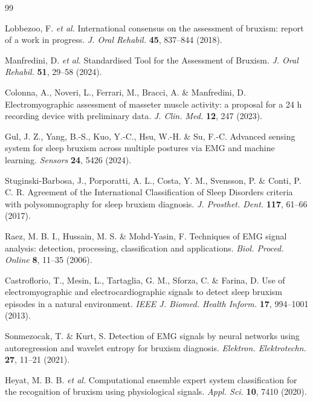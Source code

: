\documentclass[pdflatex,sn-nature,iicol]{sn-jnl}
\begin{document}
\begin{thebibliography}{99}

Lobbezoo, F. \emph{et al.} International consensus on the assessment of bruxism: report of a work in progress. \emph{J. Oral Rehabil.} \textbf{45}, 837--844 (2018).

Manfredini, D. \emph{et al.} Standardised Tool for the Assessment of Bruxism. \emph{J. Oral Rehabil.} \textbf{51}, 29--58 (2024).

Colonna, A., Noveri, L., Ferrari, M., Bracci, A. \& Manfredini, D. Electromyographic assessment of masseter muscle activity: a proposal for a 24 h recording device with preliminary data. \emph{J. Clin. Med.} \textbf{12}, 247 (2023).

Gul, J. Z., Yang, B.-S., Kuo, Y.-C., Hsu, W.-H. \& Su, F.-C. Advanced sensing system for sleep bruxism across multiple postures via EMG and machine learning. \emph{Sensors} \textbf{24}, 5426 (2024).

Stuginski-Barbosa, J., Porporatti, A. L., Costa, Y. M., Svensson, P. \& Conti, P. C. R. Agreement of the International Classification of Sleep Disorders criteria with polysomnography for sleep bruxism diagnosis. \emph{J. Prosthet. Dent.} \textbf{117}, 61--66 (2017).

Raez, M. B. I., Hussain, M. S. \& Mohd-Yasin, F. Techniques of EMG signal analysis: detection, processing, classification and applications. \emph{Biol. Proced. Online} \textbf{8}, 11--35 (2006).

Castroflorio, T., Mesin, L., Tartaglia, G. M., Sforza, C. \& Farina, D. Use of electromyographic and electrocardiographic signals to detect sleep bruxism episodes in a natural environment. \emph{IEEE J. Biomed. Health Inform.} \textbf{17}, 994--1001 (2013).

Sonmezocak, T. \& Kurt, S. Detection of EMG signals by neural networks using autoregression and wavelet entropy for bruxism diagnosis. \emph{Elektron. Elektrotechn.} \textbf{27}, 11--21 (2021).

Heyat, M. B. B. \emph{et al.} Computational ensemble expert system classification for the recognition of bruxism using physiological signals. \emph{Appl. Sci.} \textbf{10}, 7410 (2020).


\end{thebibliography}
\end{document}
